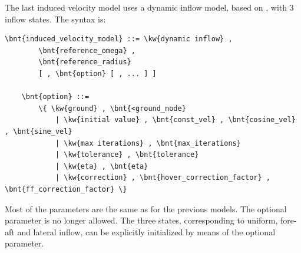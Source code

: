 The last induced velocity model uses a dynamic inflow model,
based on \cite{PITT}, with 3 inflow states.
The syntax is:
\begin{Verbatim}[commandchars=\\\{\}]
    \bnt{induced_velocity_model} ::= \kw{dynamic inflow} , 
        \bnt{reference_omega} , 
        \bnt{reference_radius} 
        [ , \bnt{option} [ , ... ] ]

    \bnt{option} ::=
        \{ \kw{ground} , \bnt{<ground_node}
            | \kw{initial value} , \bnt{const_vel} , \bnt{cosine_vel} , \bnt{sine_vel}
            | \kw{max iterations} , \bnt{max_iterations}
            | \kw{tolerance} , \bnt{tolerance}
            | \kw{eta} , \bnt{eta}
            | \kw{correction} , \bnt{hover_correction_factor} , \bnt{ff_correction_factor} \}
\end{Verbatim}
Most of the parameters are the same as for the previous models.
The optional  parameter is no longer allowed.
The three states, corresponding to uniform, fore-aft and lateral inflow,
can be explicitly initialized by means of the optional 
 parameter.


